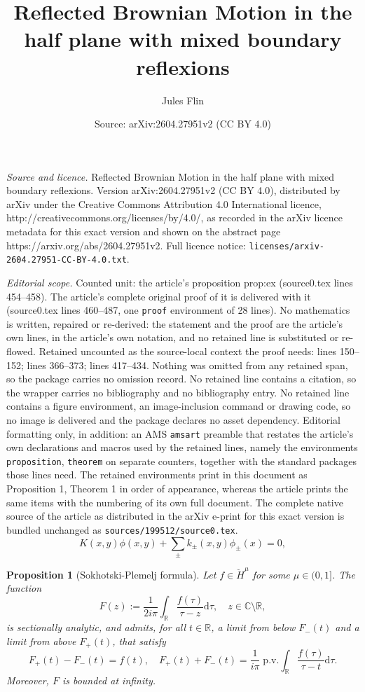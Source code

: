 \documentclass[10pt,a4paper]{amsart}
\title{Reflected Brownian Motion in the half plane with mixed boundary reflexions}
\author{Jules Flin}
\date{Source: arXiv:2604.27951v2 (CC BY 4.0)}
\newtheorem{proposition}{Proposition}
\begin{document}
\maketitle

\noindent\emph{Source and licence.} Reflected Brownian Motion in the half plane with mixed boundary reflexions. Version arXiv:2604.27951v2 (CC BY 4.0), distributed by arXiv under the Creative Commons Attribution 4.0 International licence, http://creativecommons.org/licenses/by/4.0/, as recorded in the arXiv licence metadata for this exact version and shown on the abstract page https://arxiv.org/abs/2604.27951v2. Full licence notice: \texttt{licenses/arxiv-2604.27951-CC-BY-4.0.txt}.\par\smallskip

\noindent\textit{Editorial scope.} Counted unit: the article's proposition prop:ex (source0.tex lines 454--458). The article's complete original proof of it is delivered with it (source0.tex lines 460--487, one \texttt{proof} environment of 28 lines). No mathematics is written, repaired or re-derived: the statement and the proof are the article's own lines, in the article's own notation, and no retained line is substituted or re-flowed.  Retained uncounted as the source-local context the proof needs: lines 150--152; lines 366--373; lines 417--434.  Nothing was omitted from any retained span, so the package carries no omission record.  No retained line contains a citation, so the wrapper carries no bibliography and no bibliography entry.  No retained line contains a figure environment, an image-inclusion command or drawing code, so no image is delivered and the package declares no asset dependency.  Editorial formatting only, in addition: an AMS \texttt{amsart} preamble that restates the article's own declarations and macros used by the retained lines, namely the environments \texttt{proposition}, \texttt{theorem} on separate counters, together with the standard packages those lines need.  The retained environments print in this document as Proposition 1, Theorem 1 in order of appearance, whereas the article prints the same items with the numbering of its own full document.  The complete native source of the article as distributed in the arXiv e-print for this exact version is bundled unchanged as \texttt{sources/199512/source0.tex}.
\begin{equation}\label{eq:FE}
    K(x,y)\phi(x,y)+\sum_\pm k_\pm(x,y)\phi_\pm(x)=0,
\end{equation}

\begin{proposition}[Sokhotski-Plemelj formula]\label{prop:SP} Let $f\in \breve{H}^\mu$ for some $\mu\in (0,1]$. The function
$$F(z):=\frac{1}{2i\pi}\int_{\mathbb R}\frac{ f(\tau)}{\tau-z}\mathrm{d}\tau,\quad z\in\mathbb C\setminus \mathbb R,$$
is sectionally analytic, and admits, for all $t\in\mathbb R$, a limit from below $F_-(t)$ and a limit from above $F_+(t)$, that satisfy
\begin{equation}\label{eq:jump_cond}
    F_+(t)-F_-(t)=f(t),\quad F_+(t)+F_-(t)=\frac{1}{i\pi }\;\mathrm{p.v.}\int_{\mathbb R}\frac{f(\tau)}{\tau-t}\mathrm{d}\tau.
\end{equation}
Moreover, $F$ is bounded at infinity.
\end{proposition}
\end{document}
